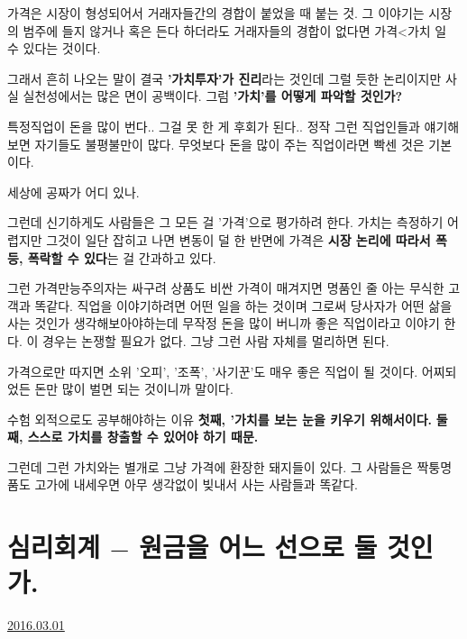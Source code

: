 가격은 시장이 형성되어서 거래자들간의 경합이 붙었을 때 붙는 것.
그 이야기는 시장의 범주에 들지 않거나 혹은 든다 하더라도 거래자들의 경합이 없다면 가격<가치 일 수 있다는 것이다.
\vspace{5mm}

그래서 흔히 나오는 말이 결국 \textbf{'가치투자'가 진리}라는 것인데
그럴 듯한 논리이지만 사실 실천성에서는 많은 면이 공백이다. 그럼 \textbf{'가치'를 어떻게 파악할 것인가?}
\vspace{5mm}

특정직업이 돈을 많이 번다.. 그걸 못 한 게 후회가 된다..
정작 그런 직업인들과 얘기해보면 자기들도 불평불만이 많다.
무엇보다 돈을 많이 주는 직업이라면 빡센 것은 기본이다.
\vspace{5mm}

세상에 공짜가 어디 있나.
\vspace{5mm}

그런데 신기하게도 사람들은 그 모든 걸 '가격'으로 평가하려 한다.
가치는 측정하기 어렵지만 그것이 일단 잡히고 나면 변동이 덜 한 반면에
가격은 \textbf{시장 논리에 따라서 폭등, 폭락할 수 있다}는 걸 간과하고 있다.
\vspace{5mm}

그런 가격만능주의자는 싸구려 상품도 비싼 가격이 매겨지면 명품인 줄 아는 무식한 고객과 똑같다.
직업을 이야기하려면 어떤 일을 하는 것이며 그로써 당사자가 어떤 삶을 사는 것인가 생각해보아야하는데
무작정 돈을 많이 버니까 좋은 직업이라고 이야기 한다.
이 경우는 논쟁할 필요가 없다. 그냥 그런 사람 자체를 멀리하면 된다.
\vspace{5mm}

가격으로만 따지면 소위 '오피', '조폭', '사기꾼'도 매우 좋은 직업이 될 것이다.
어찌되었든 돈만 많이 벌면 되는 것이니까 말이다.
\vspace{5mm}

수험 외적으로도 공부해야하는 이유
\textbf{첫째, '가치를 보는 눈을 키우기 위해서이다.}
\textbf{둘째, 스스로 가치를 창출할 수 있어야 하기 때문.}
\vspace{5mm}

그런데 그런 가치와는 별개로 그냥 가격에 환장한 돼지들이 있다.
그 사람들은 짝퉁명품도 고가에 내세우면 아무 생각없이 빚내서 사는 사람들과 똑같다.






\section{심리회계 $-$ 원금을 어느 선으로 둘 것인가.}
\href{https://www.kockoc.com/Apoc/658036}{2016.03.01}


